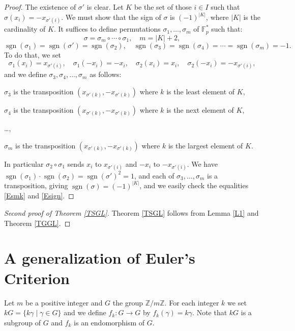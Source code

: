 \documentclass[12pt,letterpaper]{article}
\newcommand{\F}{\mathbb F}
\newcommand{\Z}{\mathbb Z}
\newcommand{\sgn}{\operatorname{sgn}}
\begin{document}
\begin{proof} 
The existence of \(\sigma'\) is clear. Let \(K\) be the set of those \(i\in I\) such that \(\sigma(x_i)=-x_{\sigma'(i)}\). We must show that the sign of \(\sigma\) is \((-1)^{|K|}\), where \(|K|\) is the cardinality of \(K\). It suffices to define permutations \(\sigma_1,\ldots,\sigma_m\) of \(\F_p^*\) such that: 
\begin{equation}\label{Esmk} 
\sigma=\sigma_m\circ\cdots\circ \sigma_1,\quad m=|K|+2,
\end{equation} 
\begin{equation}\label{Esign} 
\sgn(\sigma_1)=\sgn(\sigma')=\sgn(\sigma_2),\quad\sgn(\sigma_3)=\sgn(\sigma_4)=\cdots =\sgn(\sigma_m)=-1.
\end{equation} 
To do that, we set 
\[
\sigma_1(x_i)=x_{\sigma'(i)},\quad\sigma_1(-x_i)=-x_i,\quad\sigma_2(x_i)=x_i,\quad\sigma_2(-x_i)=-x_{\sigma'(i)},
\] 
and we define \(\sigma_3,\sigma_4,\ldots,\sigma_m\) as follows: 

\(\sigma_3\) is the transposition \((x_{\sigma'(k)},-x_{\sigma'(k)})\) where \(k\) is the least element of \(K\), 

\(\sigma_4\) is the transposition \((x_{\sigma'(k)},-x_{\sigma'(k)})\) where \(k\) is the next element of \(K\), 

\ldots, 

\(\sigma_m\) is the transposition \((x_{\sigma'(k)},-x_{\sigma'(k)})\) where \(k\) is the largest element of \(K\). 

\noindent In particular \(\sigma_2\circ\sigma_1\) sends \(x_i\) to \(x_{\sigma'(i)}\) and \(-x_i\) to \(-x_{\sigma'(i)}\). We have \(\sgn(\sigma_1)\cdot\sgn(\sigma_2)=\sgn(\sigma')^2=1\), and each of \(\sigma_3,\ldots,\sigma_m\) is a transposition, giving \(\sgn(\sigma)=(-1)^{|K|}\), and we easily check the equalities \eqref{Esmk} and \eqref{Esign}.  
\end{proof} 

\begin{proof}[Second proof of Theorem \ref{TSGL}] 
Theorem \ref{TSGL} follows from Lemma \ref{L1} and Theorem \ref{TGGL}. 
\end{proof} 

\section{A generalization of Euler's Criterion}%

Let \(m\) be a positive integer and \(G\) the group \(\Z/m\Z\). For each integer \(k\) we set \(kG=\{k\gamma\mid\gamma\in G\}\) and we define \(f_k:G\to G\) by \(f_k(\gamma)=k\gamma\). Note that \(kG\) is a subgroup of \(G\) and \(f_k\) is an endomorphism of \(G\). 
\end{document}
